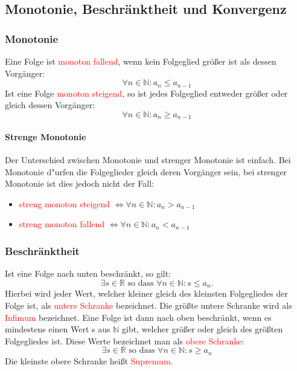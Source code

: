 \subsection{Monotonie, Beschränktheit und Konvergenz}
\subsubsection{Monotonie}
Eine Folge ist \textcolor{red}{monoton fallend}, wenn kein Folgeglied größer ist als dessen Vorgänger:
\begin{equation*}
\forall n \in \mathbb{N} : a_n \leq a_{n-1}
\end{equation*}
Ist eine Folge \textcolor{red}{monoton steigend}, so ist jedes Folgeglied entweder größer oder gleich dessen Vorgänger:
\begin{equation*}
\forall n\in{\mathbb{N}}: a_n \geq a_{n-1}
\end{equation*}

\paragraph{Strenge Monotonie} 
Der Unterschied zwischen Monotonie und strenger Monotonie ist einfach. Bei Monotonie d"urfen die Folgeglieder gleich deren Vorgänger sein, bei strenger Monotonie ist dies jedoch nicht der Fall:
\begin{itemize}
\item \textcolor{red}{streng monoton steigend} $\Leftrightarrow \forall n\in\mathbb{N}: a_n > a_{n-1}$
\item \textcolor{red}{streng monoton fallend} $\Leftrightarrow \forall n\in\mathbb{N}: a_n < a_{n-1}$
\end{itemize}

\subsubsection{Beschränktheit}
Ist eine Folge nach unten beschränkt, so gilt:
\begin{equation*}
\exists s \in \mathbb{R} \text{ so dass } \forall n \in \mathbb{N}: s \leq a_n.
\end{equation*}
Hierbei wird jeder Wert, welcher kleiner gleich des kleinsten Folgegliedes der Folge ist, als \textcolor{red}{untere Schranke} bezeichnet. Die größte untere Schranke wird als \textcolor{red}{Infimum} bezeichnet. Eine Folge ist dann nach oben beschränkt, wenn es mindestens einen Wert s aus $\mathbb{N}$ gibt, welcher größer oder gleich des größten Folgegliedes ist. Diese Werte bezeichnet man als \textcolor{red}{obere Schranke}:
\begin{equation*}
\exists s \in \mathbb{R} \text{ so dass } \forall n \in \mathbb{N} : s\geq a_n 
\end{equation*}
Die kleinste obere Schranke heißt \textcolor{red}{Supremum}.

